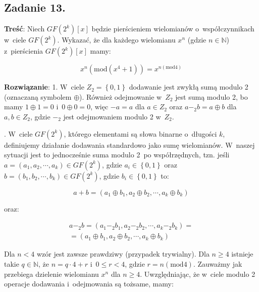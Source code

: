 \documentclass[a4paper,10pt, twocolumn]{article}
\begin{document}
\subsection{Zadanie 13.}

\textbf{Treść}: Niech $GF(2^{k})[x]$ będzie pierścieniem wielomianów o~współczynnikach w~ciele $GF(2^{k})$. Wykazać, że dla każdego wielomianu $x^{n}$ (gdzie $n \in \mathbb{N}$) z~pierścienia $GF(2^{k})[x]$ mamy:

\begin{equation*}
	x^{n}(\text{mod}(x^{4} + 1)) = x^{n(\text{mod} 4)}
\end{equation*}

\textbf{Rozwiązanie}: 1. W~ciele $Z_{2} = \left\{0,1\right\}$ dodawanie jest zwykłą sumą modulo 2 (oznaczaną symbolem $\oplus$). Również odejmowanie w~$Z_{2}$ jest sumą modulo 2, bo mamy $1 \oplus 1 = 0$ i~$0 \oplus 0 = 0$, więc $-a = a$ dla $a \in Z_{2}$ oraz $a -_{2} b = a \oplus b$ dla $a, b \in Z_{2}$, gdzie $-_{2}$ jest odejmowaniem modulo 2 w~$Z_{2}$.

. W~ciele $GF(2^{k})$, którego elementami są słowa binarne o~długości $k$, definiujemy działanie dodawania standardowo jako sumę wielomianów. W~naszej sytuacji jest to jednocześnie suma modulo 2~po współrzędnych, tzn. jeśli $a = (a_{1}, a_{2}, \cdots, a_{k}) \in GF(2^{k})$, gdzie $a_{i} \in \left\{0,1\right\}$ oraz $b = (b_{1}, b_{2}, \cdots, b_{k}) \in GF(2^{k})$, gdzie $b_{i} \in \left\{0,1\right\}$ to:

\begin{equation*}
	a + b = (a_{1} \oplus b_{1}, a_{2} \oplus b_{2}, \cdots, a_{k} \oplus b_{k})
\end{equation*}

\noindent oraz:

\begin{equation*}
	\begin{array}{c} a -_{2} b = (a_{1} -_{2} b_{1}, a_{2} -_{2} b_{2}, \cdots, a_{k} -_{2} b_{k}) = \\ = (a_{1} \oplus b_{1}, a_{2} \oplus b_{2}, \cdots, a_{k} \oplus b_{k}) \end{array}
\end{equation*}

\noindent Dla $n < 4$ wzór jest zawsze prawdziwy (przypadek trywialny). Dla $n \geq 4$ istnieje takie $q \in \mathbb{N}$, że $n = q \cdot 4 + r$ i~$0 \leq r < 4$, gdzie $r = n (\text{mod} 4)$. Zauważmy jak przebiega dzielenie wielomianu $x^{n}$ dla $n \geq 4$. Uwzględniając, że w~ciele modulo 2 operacje dodawania i~odejmowania są tożsame, mamy:
\end{document}
